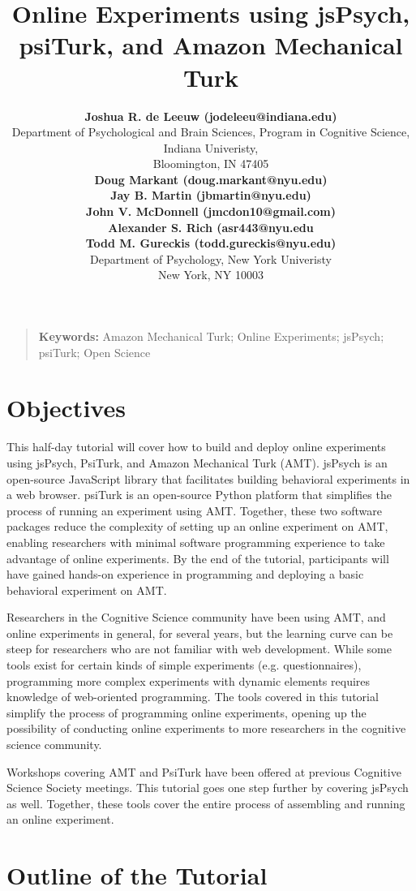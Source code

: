 \documentclass[10pt,letterpaper]{article}
\title{Online Experiments using jsPsych, psiTurk, and Amazon Mechanical Turk}
\author{{\large \bf Joshua R. de Leeuw (jodeleeu@indiana.edu)} \\
  Department of Psychological and Brain Sciences,
  Program in Cognitive Science,
  Indiana Univeristy, \\
  Bloomington, IN 47405
  \AND {\large \bf Anna Coenen (ac4066@nyu.edu)} \\
 {\large \bf Doug Markant (doug.markant@nyu.edu)}\\
  {\large \bf Jay B. Martin (jbmartin@nyu.edu)} \\
    {\large \bf John V. McDonnell (jmcdon10@gmail.com)} \\
  {\large \bf Alexander S. Rich (asr443@nyu.edu} \\
  {\large \bf Todd M. Gureckis (todd.gureckis@nyu.edu)} \\
  Department of Psychology,
  New York Univeristy \\
  New York, NY 10003}
\begin{document}
\maketitle

\begin{quote}
\small
\textbf{Keywords:} 
Amazon Mechanical Turk; Online Experiments; jsPsych; psiTurk; Open Science
\end{quote}

\section{Objectives}

This half-day tutorial will cover how to build and deploy online experiments
using jsPsych, PsiTurk, and Amazon Mechanical Turk (AMT). jsPsych is an open-source JavaScript library that facilitates building behavioral experiments in a web browser. psiTurk is an open-source Python platform that simplifies the process of running an experiment using AMT. Together, these two software packages reduce the complexity of setting up an online experiment on AMT, enabling researchers with minimal software programming experience to take advantage of online experiments. By the end of the tutorial, participants will have gained hands-on experience in programming and deploying a basic behavioral experiment on AMT.

Researchers in the Cognitive Science community have been using AMT, and online experiments in general, for several years, but the learning curve can be steep for researchers who are not familiar with web development. While some tools exist for certain kinds of simple experiments (e.g. questionnaires), programming more complex experiments with dynamic elements requires knowledge of web-oriented programming. The tools covered in this tutorial simplify the process of programming online experiments, opening up the possibility of conducting online experiments to more researchers in the cognitive science community.

Workshops covering AMT \cite{mason2011use} and PsiTurk \cite{coenen2013using} have been offered at previous Cognitive Science Society meetings. This tutorial goes one step further by covering jsPsych as well. Together, these tools cover the entire process of assembling and running an online experiment.

\section{Outline of the Tutorial}
\end{document}
